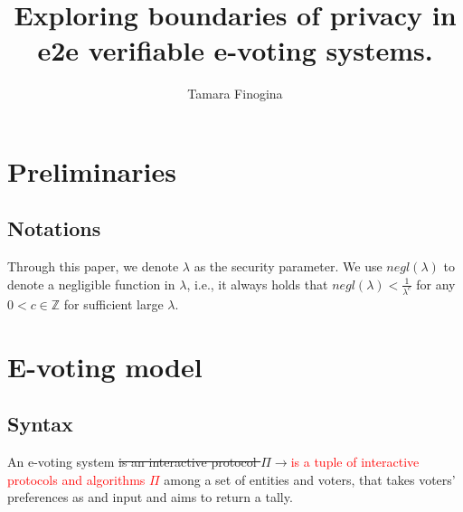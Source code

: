 \documentclass[12pt]{article}
\author{Tamara Finogina}
\title{Exploring boundaries of privacy in e2e verifiable e-voting systems.}
\date{}
\newcommand{\fix}[2]{\sout{#1}$\rightarrow$\textcolor{red}{#2}}
\begin{document}
\maketitle
\section{Preliminaries} 
\subsection{Notations}
Through this paper, we denote $\lambda$ as the security parameter. We use $negl(\lambda)$ to denote a negligible function in $\lambda$, i.e., it always holds that $negl(\lambda) < \frac{1}{\lambda^c}$ for any $0<c \in \mathbb{Z}$ for sufficient large $\lambda$. 
\section{E-voting model}
\subsection{Syntax} 
An e-voting system \fix{is an interactive protocol $\Pi$}{is a tuple of interactive protocols and algorithms $\Pi$} among a set of entities and voters, that takes  voters' preferences as and input and aims to return a tally. \\
\end{document}
